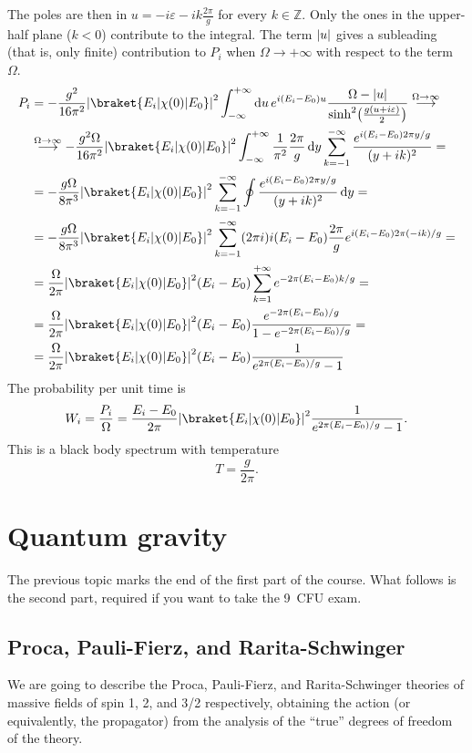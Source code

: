 \documentclass[a4paper,12pt]{book}
\DeclarePairedDelimiter{\abs}{\lvert}{\rvert}
\newcommand{\dd}{\mathop{\mathrm{d}\!}{}}
\renewcommand{\epsilon}{\varepsilon}
\theoremstyle{definition}
\theoremstyle{remark}
\begin{document}
The poles are then in $u=-i\epsilon-ik\frac{2\pi}g$ for every $k\in\mathbb Z$. Only the ones in the upper-half plane ($k<0$) contribute to the integral. The term $\abs{u}$ gives a subleading (that is, only finite) contribution to $P_i$ when $\Omega\to+\infty$ with respect to the term $\Omega$.
\begin{align*}
P_i&=-\frac{g^2}{16\pi^2}\abs*{\braket{E_i|\chi(0)|E_0}}^2\int_{-\infty}^{+\infty}\dd u\,e^{i(E_i-E_0)u}\frac{\Omega-\abs{u}}{\sinh^2\bigl(\frac{g(u+i\epsilon)}2\bigr)}\overset{\Omega\to\infty}{\longrightarrow}\\
&\overset{\Omega\to\infty}{\longrightarrow}-\frac{g^2\Omega}{16\pi^2}\abs*{\braket{E_i|\chi(0)|E_0}}^2\int_{-\infty}^{+\infty}\frac1{\pi^2}\frac{2\pi}{g}\dd y\sum_{k=-1}^{-\infty}\frac{e^{i(E_i-E_0)2\pi y/g}}{(y+ik)^2}=\\
&=-\frac{g\Omega}{8\pi^3}\abs*{\braket{E_i|\chi(0)|E_0}}^2\sum_{k=-1}^{-\infty}\oint\frac{e^{i(E_i-E_0)2\pi y/g}}{(y+ik)^2}\dd y=\\
&=-\frac{g\Omega}{8\pi^3}\abs*{\braket{E_i|\chi(0)|E_0}}^2\sum_{k=-1}^{-\infty}(2\pi i)i(E_i-E_0)\frac{2\pi}{g}e^{i(E_i-E_0)2\pi (-ik)/g}=\\
&=\frac{\Omega}{2\pi}\abs*{\braket{E_i|\chi(0)|E_0}}^2(E_i-E_0)\sum_{k=1}^{+\infty}e^{-2\pi(E_i-E_0)k/g}=\\
&=\frac{\Omega}{2\pi}\abs*{\braket{E_i|\chi(0)|E_0}}^2(E_i-E_0)\frac{e^{-2\pi(E_i-E_0)/g}}{1-e^{-2\pi(E_i-E_0)/g}}=\\
&=\frac{\Omega}{2\pi}\abs*{\braket{E_i|\chi(0)|E_0}}^2(E_i-E_0)\frac1{e^{2\pi(E_i-E_0)/g}-1}
\end{align*}
The probability per unit time is
\[W_i=\frac{P_i}{\Omega}=\frac{E_i-E_0}{2\pi}\abs*{\braket{E_i|\chi(0)|E_0}}^2\frac1{e^{2\pi(E_i-E_0)/g}-1}.\]
This is a black body spectrum with temperature
\[T=\frac{g}{2\pi}.\]

\chapter{Quantum gravity}
The previous topic marks the end of the first part of the course.
What follows is the second part, required if you want to take the \SI{9}{CFU} exam.

\section{Proca, Pauli-Fierz, and Rarita-Schwinger}
We are going to describe the Proca, Pauli-Fierz, and Rarita-Schwinger theories of 
massive fields of spin 1, 2, and 3/2 respectively, obtaining the action 
(or equivalently, the propagator) from the analysis of the ``true'' degrees of 
freedom of the theory.
\end{document}

